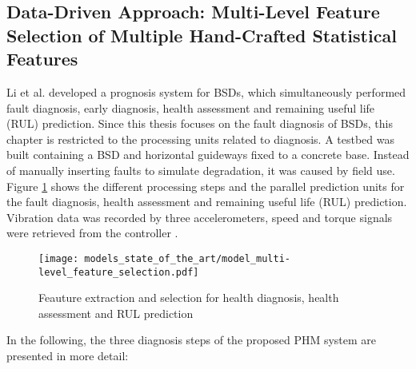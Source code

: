 \subsection{Data-Driven Approach: Multi-Level Feature Selection of Multiple Hand-Crafted Statistical Features}
Li et al. \cite{LiPin2018} developed a prognosis system for BSDs, which simultaneously performed fault diagnosis, early diagnosis, health assessment and remaining useful life (RUL) prediction. Since this thesis focuses on the fault diagnosis of BSDs, this chapter is restricted to the processing units related to diagnosis. A testbed was built containing a BSD and horizontal guideways fixed to a concrete base. Instead of manually inserting faults to simulate degradation, it was caused by field use. Figure \ref{fig:level_feature_selection_model} shows the different processing steps and the parallel prediction units for the fault diagnosis, health assessment and remaining useful life (RUL) prediction. Vibration data was recorded by three accelerometers, speed and torque signals were retrieved from the controller \cite{LiPin2018}. 

\begin{figure}[H]
  \centering
  \texttt{[image: models\_state\_of\_the\_art/model\_multi-level\_feature\_selection.pdf]}
  \caption{Feauture extraction and selection for health diagnosis, health assessment and RUL prediction \cite{LiPin2018}}
  \label{fig:level_feature_selection_model}
\end{figure}

\newpage
In the following, the three diagnosis steps of the proposed PHM system are presented in more detail:

